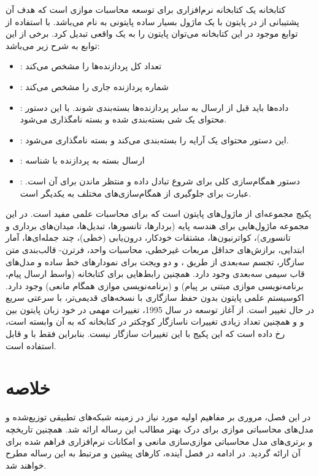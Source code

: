 کتابخانه  یک کتابخانه نرم‌افزاری برای توسعه محاسبات موازی  است که هدف آن پشتیبانی از  در پایتون با یک ماژول بسیار ساده پایتونی به نام  می‌باشد. با استفاده از توابع موجود در این کتابخانه می‌توان پایتون را به یک  واقعی تبدیل کرد. برخی از این توابع به شرح زیر می‌باشد:
\begin{itemize}
	\item 
	: تعداد کل پردازنده‌ها را مشخص می‌کند
	\item 
	: شماره پردازنده جاری را مشخص می‌کند
	\item 
	: داده‌ها باید قبل از ارسال به سایر پردازنده‌ها بسته‌بندی شوند. با این دستور محتوای یک شی بسته‌بندی شده و بسته   نامگذاری می‌شود.
	\item 
	: این دستور محتوای یک آرایه  را بسته‌بندی می‌کند و بسته   نامگذاری می‌شود.
	\item 
	: ارسال بسته  به پردازنده با شناسه‌ 
	\item 
	:	دستور همگام‌سازی کلی برای شروع تبادل داده و منتظر ماندن برای آن است. عبارت  برای جلوگیری از همگام‌سازی‌های مختلف به یکدیگر است.
\end{itemize}

پکیج  مجموعه‌ای از ماژول‌های پایتون است که برای محاسبات علمی مفید است. در این مجموعه ماژول‌هایی برای هندسه پایه (بردارها، تانسورها، تبدیل‌ها، میدان‌های برداری و تانسوری)، کواترنیون‌ها، مشتقات خودکار، درون‌یابی (خطی)، چند جمله‌ای‌ها، آمار ابتدایی، برازش‌های حداقل مربعات غیرخطی، محاسبات واحد، فرترن- قالب‌بندی متن سازگار، تجسم سه‌بعدی از طریق ، و دو ویجت  برای نمودارهای خط ساده و مدل‌های قاب سیمی سه‌بعدی وجود دارد. همچنین رابط‌هایی برای کتابخانه (واسط ارسال پیام، برنامه‌نویسی موازی مبتنی بر پیام) و  (برنامه‌نویسی موازی همگام مانعی) وجود دارد. اکوسیستم علمی پایتون بدون حفظ سازگاری با نسخه‌های قدیمی‌تر، با سرعتی سریع در حال تغییر است. از آغاز توسعه  در سال 1995، تغییرات مهمی در خود زبان پایتون بین  و  و همچنین تعداد زیادی تغییرات ناسازگار کوچکتر در کتابخانه  که  به آن وابسته است، رخ داده است که این پکیج با این تغییرات سازگار نیست. بنابراین  فقط با  و  قابل استفاده است.


\section{خلاصه}
در این فصل، مروری بر مفاهیم اولیه مورد نیاز در زمینه شبکه‌های تطبیقی توزیع‌شده و مدل‌های محاسباتی موازی برای درک بهتر مطالب این رساله ارائه شد. همچنین تاریخچه و برتری‌های مدل محاسباتی موازی‌سازی مانعی و امکانات نرم‌افزاری فراهم شده برای آن ارائه گردید. در ادامه در فصل آینده، کارهای پیشین و مرتبط به این رساله مطرح خواهند شد. 









